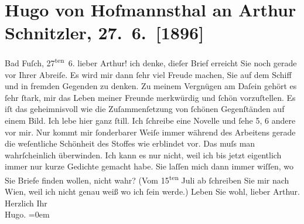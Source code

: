 

         \renewcommand{\erwaehnteOrte}{Orte: Bad Fusch, Wien}
         \renewcommand{\erwaehnteWerke}{Werke: Geschichte der beiden Liebespaare}
               \section[Hugo von Hofmannsthal an Arthur Schnitzler, 27. 6. {[}1896{]}]{ Hugo von Hofmannsthal an Arthur Schnitzler,
                    27. 6. {[}1896{]}}\nopagebreak{}\rehead{ }\begin{ledgroupsized}[t]{13cm}\normalsize\beginnumbering \toendnotes[C]{\smallbreak\pagebreak[2]} 
\toendnotes[C]{\smallbreak}\pstart
           \raggedleft{}{\pb}Bad Fuſch, 27\textsuperscript{ten} 6.\pend
           \pstart{}lieber Arthur!\pend\pstart
           ich denke, dieſer Brief erreicht Sie noch gerade vor Ihrer Abreiſe. Es wird mir
                    dann ſehr viel Freude machen, Sie auf dem Schiff und in fremden Gegenden zu
                    denken. Zu meinem Vergnügen am Daſein gehört es ſehr ſtark, mir das Leben meiner
                    Freunde merkwürdig und ſchön vorzuſtellen. Es iſt das geheimnis{\pb}voll wie die Zuſammenſetzung
                    von ſchönen Gegenſtänden auf einem Bild.\pend
           \pstart
           Ich lebe hier ganz ſtill. Ich ſchreibe eine Novelle und ſehe 5, 6 andere vor mir. Nur kommt mir
                    ſonderbarer Weiſe immer während des Arbeitens gerade die weſentliche Schönheit
                    des Stoffes wie erblindet vor. Das muſs man wahrſcheinlich überwinden. Ich kann
                    es nur nicht, weil ich bis jetzt eigentlich immer nur {\pb}kurze Gedichte gemacht
                    habe.\pend
           \pstart
           Sie laſſen mich dann immer wiſſen, wo Sie Briefe finden wollen, nicht wahr? (Vom
                            15\textsuperscript{ten} Juli ab ſchreiben Sie mir
                    nach Wien, weil ich nicht genau weiß wo ich
                    ſein werde.) Leben Sie wohl, lieber Arthur.\pend
           \pstart
           Herzlich Ihr{\\[\baselineskip]}\spacefill\mbox{Hugo.}\pend
           \leftskip=0em{}
         

\end{ledgroupsized}
